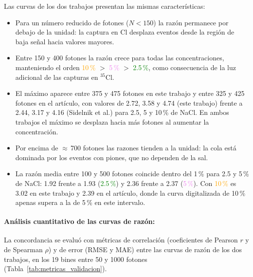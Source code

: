 Las curvas de los dos trabajos presentan las mismas características:
\begin{itemize}
	\item Para un número reducido de fotones ($N<150$) la razón permanece por debajo de la unidad: la captura en Cl desplaza eventos desde la región de baja señal hacia valores mayores.
	\item Entre 150 y 400 fotones la razón crece para todas las concentraciones, manteniendo el orden \textcolor{orange}{10\,\%} $>$ \textcolor{violet}{5\,\%} $>$ \textcolor{green}{2.5\,\%}, como consecuencia de la luz adicional de las capturas en $^{35}$Cl.
	\item El máximo aparece entre 375 y 475 fotones en este trabajo y entre 325 y 425 fotones en el artículo, con valores de 2.72, 3.58 y 4.74 (este trabajo) frente a 2.44, 3.17 y 4.16 (Sidelnik et al.) para 2.5, 5 y 10\,\% de NaCl. En ambos trabajos el máximo se desplaza hacia más fotones al aumentar la concentración.
	\item Por encima de $\approx$\,700 fotones las razones tienden a la unidad: la cola está dominada por los eventos con piones, que no dependen de la sal.
	\item La razón media entre 100 y 500 fotones coincide dentro del 1\,\% para 2.5 y 5\,\% de NaCl: 1.92 frente a 1.93 (\textcolor{green}{2.5\,\%}) y 2.36 frente a 2.37 (\textcolor{violet}{5\,\%}). Con \textcolor{orange}{10\,\%} es 3.02 en este trabajo y 2.39 en el artículo, donde la curva digitalizada de 10\,\% apenas supera a la de 5\,\% en este intervalo.
\end{itemize}

\paragraph{Análisis cuantitativo de las curvas de razón:} La concordancia se evaluó con métricas de correlación (coeficientes de Pearson $r$ y de Spearman $\rho$) y de error (RMSE y MAE) entre las curvas de razón de los dos trabajos, en los 19 bines entre 50 y 1000 fotones (Tabla~\ref{tab:metricas_validacion}).

